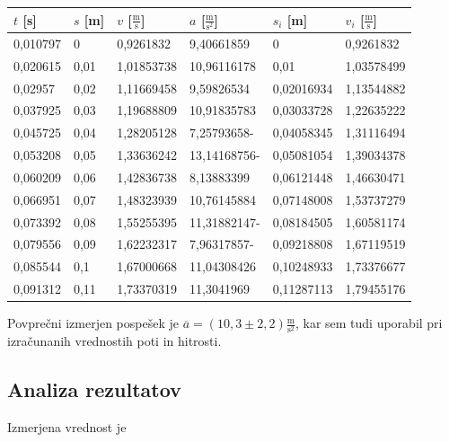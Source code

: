 \documentclass[12pt]{article}
\begin{document}
	\begin{table}[h!]
		\centering
		\begin{tabular}{|l|l|l|l|l|l|}
		\hline
		$t$ [s] 	& $s$ [m] 	& $v$ [$\frac{\text{m}}{\text{s}}$] & $a$ [$\frac{\text{m}}{\text{s}^2}$] 	& $s_i$ [m] 	& $v_i$ [$\frac{\text{m}}{\text{s}}$] 	\\ \hline
		0,010797	& 0			& 0,9261832							& 9,40661859							& 0				& 0,9261832								\\ \hline
		0,020615	& 0,01		& 1,01853738						& 10,96116178							& 0,01			& 1,03578499							\\ \hline
		0,02957		& 0,02		& 1,11669458						& 9,59826534							& 0,02016934	& 1,13544882							\\ \hline
		0,037925	& 0,03		& 1,19688809						& 10,91835783							& 0,03033728	& 1,22635222							\\ \hline
		0,045725	& 0,04		& 1,28205128						& 7,25793658-							& 0,04058345	& 1,31116494							\\ \hline
		0,053208	& 0,05		& 1,33636242						& 13,14168756-							& 0,05081054	& 1,39034378							\\ \hline
		0,060209	& 0,06		& 1,42836738						& 8,13883399							& 0,06121448	& 1,46630471							\\ \hline
		0,066951	& 0,07		& 1,48323939						& 10,76145884							& 0,07148008	& 1,53737279							\\ \hline
		0,073392	& 0,08		& 1,55255395						& 11,31882147-							& 0,08184505	& 1,60581174							\\ \hline
		0,079556	& 0,09		& 1,62232317						& 7,96317857-							& 0,09218808	& 1,67119519							\\ \hline
		0,085544	& 0,1		& 1,67000668						& 11,04308426							& 0,10248933	& 1,73376677							\\ \hline
		0,091312	& 0,11		& 1,73370319						& 11,3041969							& 0,11287113	& 1,79455176							\\ \hline
		\end{tabular}
	\end{table}

	Povprečni izmerjen pospešek je $\overline{a} = (10,3 \pm 2,2) \frac{\text{m}}{\text{s}^2}$, kar
	sem tudi uporabil pri izračunanih vrednostih poti in hitrosti.
 	\subsection*{Analiza rezultatov}
	Izmerjena vrednost je 
\end{document}
